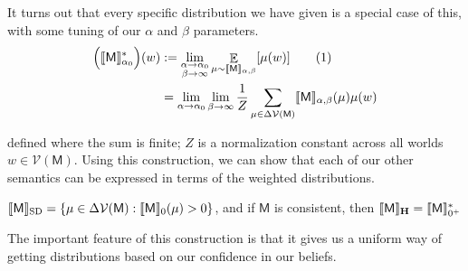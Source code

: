 \documentclass{article}
\newcommand\numberthis{\addtocounter{equation}{1}\tag{\theequation}}
\newcommand\SD{_{\text{SD}}}
\newcommand\MaxEnt{_{\mathbf H}}
\newcommand{\V}{\mathcal V}
\newcommand{\sfM}{\mathsf M}
\numberwithin{equation}{section}
\begin{document}
	It turns out that every specific distribution we have given is a special case of this, with some tuning of our $\alpha$ and $\beta$ parameters. 
	\begin{align*}
		\Big(\bbr{\sfM}_{\alpha_0}^*\Big)(w) &:= \lim_{\substack{\alpha \to \alpha_0 \\ \beta \to \infty}} 
		\E_{\mu \sim \bbr{\sfM}_{\alpha,\beta}} [\mu(w)] \numberthis\label{eqn:higher-expectation} \\
		&= \lim_{\alpha \to \alpha_0 } \lim_{\beta \to \infty}  \frac{1}{Z} \sum_{\mu \in \Delta\V(\sfM)} \bbr{\sfM}_{\alpha,\beta}(\mu) \mu(w) 
	\end{align*}
	
	defined where the sum is finite; $Z$ is a normalization constant across all worlds $w \in \V(\sfM)$. 
	Using this construction, we can show that each of our other semantics can be expressed in terms of the weighted distributions.
	
	\begin{prop}
		$\bbr{\sfM}\SD = \{ \mu \in \Delta \V(\sfM) : \bbr{\sfM}_0 (\mu) > 0 \}$, 
		and if $\sfM$ is consistent, then $\bbr{\sfM}\MaxEnt = \bbr{\sfM}_{0^+}^*$
	\end{prop}
	
	The important feature of this construction is that it gives us a uniform way of getting distributions based on our confidence in our beliefs.

	
	
\end{document}

